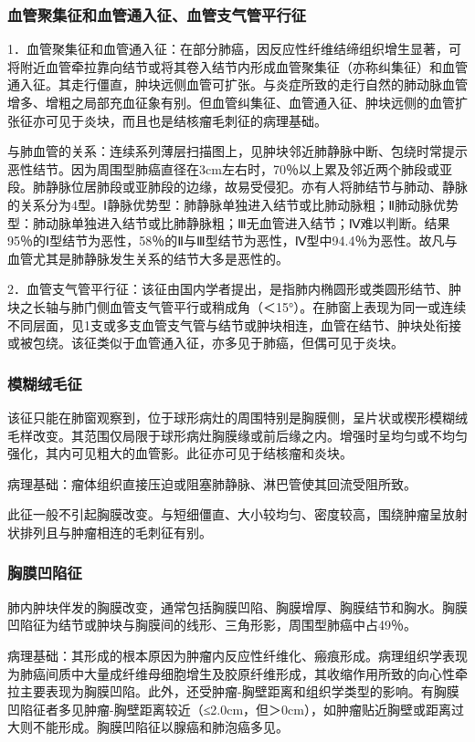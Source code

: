 \subsubsection{血管聚集征和血管通入征、血管支气管平行征}

1．血管聚集征和血管通入征：在部分肺癌，因反应性纤维结缔组织增生显著，可将附近血管牵拉靠向结节或将其卷入结节内形成血管聚集征（亦称纠集征）和血管通入征。其走行僵直，肿块远侧血管可扩张。与炎症所致的走行自然的肺动脉血管增多、增粗之局部充血征象有别。但血管纠集征、血管通入征、肿块远侧的血管扩张征亦可见于炎块，而且也是结核瘤毛刺征的病理基础。

与肺血管的关系：连续系列薄层扫描图上，见肿块邻近肺静脉中断、包绕时常提示恶性结节。因为周围型肺癌直径在3cm左右时，70％以上累及邻近两个肺段或亚段。肺静脉位居肺段或亚肺段的边缘，故易受侵犯。亦有人将肺结节与肺动、静脉的关系分为4型。Ⅰ静脉优势型：肺静脉单独进入结节或比肺动脉粗；Ⅱ肺动脉优势型：肺动脉单独进入结节或比肺静脉粗；Ⅲ无血管进入结节；Ⅳ难以判断。结果95％的Ⅰ型结节为恶性，58％的Ⅱ与Ⅲ型结节为恶性，Ⅳ型中94.4％为恶性。故凡与血管尤其是肺静脉发生关系的结节大多是恶性的。

2．血管支气管平行征：该征由国内学者提出，是指肺内椭圆形或类圆形结节、肿块之长轴与肺门侧血管支气管平行或稍成角（＜15°）。在肺窗上表现为同一或连续不同层面，见1支或多支血管支气管与结节或肿块相连，血管在结节、肿块处衔接或被包绕。该征类似于血管通入征，亦多见于肺癌，但偶可见于炎块。

\subsubsection{模糊绒毛征}

该征只能在肺窗观察到，位于球形病灶的周围特别是胸膜侧，呈片状或楔形模糊绒毛样改变。其范围仅局限于球形病灶胸膜缘或前后缘之内。增强时呈均匀或不均匀强化，其内可见粗大的血管影。此征亦可见于结核瘤和炎块。

病理基础：瘤体组织直接压迫或阻塞肺静脉、淋巴管使其回流受阻所致。

此征一般不引起胸膜改变。与短细僵直、大小较均匀、密度较高，围绕肿瘤呈放射状排列且与肿瘤相连的毛刺征有别。

\subsubsection{胸膜凹陷征}

肺内肿块伴发的胸膜改变，通常包括胸膜凹陷、胸膜增厚、胸膜结节和胸水。胸膜凹陷征为结节或肿块与胸膜间的线形、三角形影，周围型肺癌中占49％。

病理基础：其形成的根本原因为肿瘤内反应性纤维化、瘢痕形成。病理组织学表现为肺癌间质中大量成纤维母细胞增生及胶原纤维形成，其收缩作用所致的向心性牵拉主要表现为胸膜凹陷。此外，还受肿瘤-胸壁距离和组织学类型的影响。有胸膜凹陷征者多见肿瘤-胸壁距离较近（≤2.0cm，但＞0cm），如肿瘤贴近胸壁或距离过大则不能形成。胸膜凹陷征以腺癌和肺泡癌多见。

